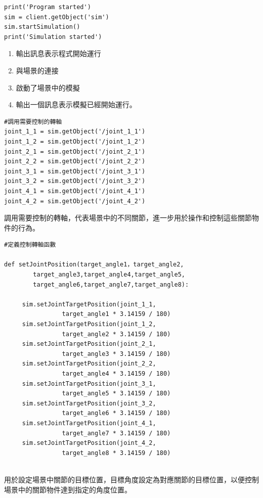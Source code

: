 \label{啟動模擬}
\begin{lstlisting}[caption=\Large 啟動模擬]
print('Program started')
sim = client.getObject('sim')
sim.startSimulation()
print('Simulation started')
\end{lstlisting}
\begin{enumerate}
\item 輸出訊息表示程式開始運行
\item 與場景的連接
\item 啟動了場景中的模擬
\item 輸出一個訊息表示模擬已經開始運行。
\end{enumerate}

\label{轉軸設定}
\begin{lstlisting}[caption=\Large 轉軸設定]
#調用需要控制的轉軸
joint_1_1 = sim.getObject('/joint_1_1')
joint_1_2 = sim.getObject('/joint_1_2')
joint_2_1 = sim.getObject('/joint_2_1')
joint_2_2 = sim.getObject('/joint_2_2')
joint_3_1 = sim.getObject('/joint_3_1')
joint_3_2 = sim.getObject('/joint_3_2')
joint_4_1 = sim.getObject('/joint_4_1')
joint_4_2 = sim.getObject('/joint_4_2')
\end{lstlisting}  

調用需要控制的轉軸，代表場景中的不同關節，進一步用於操作和控制這些關節物件的行為。\\

\label{轉軸函數}
\begin{lstlisting}[caption=\Large 轉軸函數]
#定義控制轉軸函數 

def setJointPosition(target_angle1，target_angle2,
        target_angle3,target_angle4,target_angle5,
        target_angle6,target_angle7,target_angle8):

     sim.setJointTargetPosition(joint_1_1,
                target_angle1 * 3.14159 / 180)
     sim.setJointTargetPosition(joint_1_2,
                target_angle2 * 3.14159 / 180)
     sim.setJointTargetPosition(joint_2_1,
                target_angle3 * 3.14159 / 180)
     sim.setJointTargetPosition(joint_2_2,
                target_angle4 * 3.14159 / 180)
     sim.setJointTargetPosition(joint_3_1,
                target_angle5 * 3.14159 / 180)
     sim.setJointTargetPosition(joint_3_2,
                target_angle6 * 3.14159 / 180)
     sim.setJointTargetPosition(joint_4_1,
                target_angle7 * 3.14159 / 180)
     sim.setJointTargetPosition(joint_4_2,
                target_angle8 * 3.14159 / 180)
     
\end{lstlisting}
用於設定場景中關節的目標位置，目標角度設定為對應關節的目標位置，以便控制場景中的關節物件達到指定的角度位置。\\


